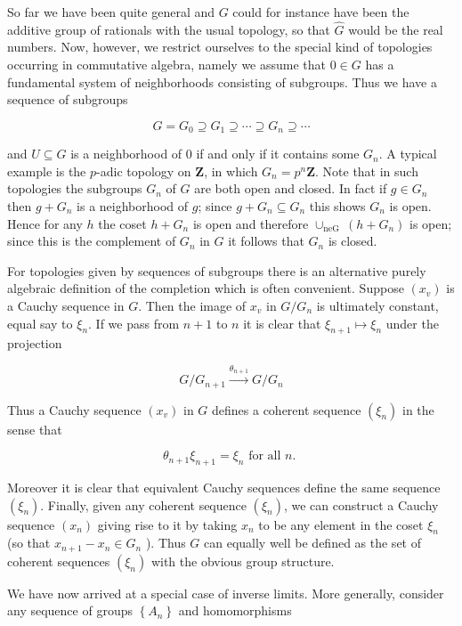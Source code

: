 \documentclass{standalone}
\theoremstyle{definition}
\theoremstyle{remark}
\begin{document}
So far we have been quite general and $G$ could for instance have been the additive group of rationals with the usual topology, so that $\hat{G}$ would be the real numbers. Now, however, we restrict ourselves to the special kind of topologies occurring in commutative algebra, namely we assume that $0 \in G$ has a fundamental system of neighborhoods consisting of subgroups. Thus we have a sequence of subgroups

\[
G=G_{0} \supseteq G_{1} \supseteq \cdots \supseteq G_{n} \supseteq \cdots
\]

and $U \subseteq G$ is a neighborhood of 0 if and only if it contains some $G_{n}$. A typical example is the $p$-adic topology on $\mathbf{Z}$, in which $G_{n}=p^{n} \mathbf{Z}$. Note that in such topologies the subgroups $G_{n}$ of $G$ are both open and closed. In fact if $g \in G_{n}$ then $g+G_{n}$ is a neighborhood of $g$; since $g+G_{n} \subseteq G_{n}$ this shows $G_{n}$ is open. Hence for any $h$ the coset $h+G_{n}$ is open and therefore $\cup_{\text {neG }}\left(h+G_{n}\right)$ is open; since this is the complement of $G_{n}$ in $G$ it follows that $G_{n}$ is closed.

For topologies given by sequences of subgroups there is an alternative purely algebraic definition of the completion which is often convenient. Suppose $\left(x_{v}\right)$ is a Cauchy sequence in $G$. Then the image of $x_{v}$ in $G / G_{n}$ is ultimately constant, equal say to $\xi_{n}$. If we pass from $n+1$ to $n$ it is clear that $\xi_{n+1} \mapsto \xi_{n}$ under the projection

\[
G / G_{n+1} \stackrel{\theta_{n+1}}{\longrightarrow} G / G_{n}
\]

Thus a Cauchy sequence $\left(x_{v}\right)$ in $G$ defines a coherent sequence $\left(\xi_{n}\right)$ in the sense that

\[
\theta_{n+1} \xi_{n+1}=\xi_{n} \text { for all } n \text {. }
\]

Moreover it is clear that equivalent Cauchy sequences define the same sequence $\left(\xi_{n}\right)$. Finally, given any coherent sequence $\left(\xi_{n}\right)$, we can construct a Cauchy sequence $\left(x_{n}\right)$ giving rise to it by taking $x_{n}$ to be any element in the coset $\xi_{n}$ (so that $x_{n+1}-x_{n} \in G_{n}$ ). Thus $G$ can equally well be defined as the set of coherent sequences $\left(\xi_{n}\right)$ with the obvious group structure.

We have now arrived at a special case of inverse limits. More generally, consider any sequence of groups $\left\{A_{n}\right\}$ and homomorphisms
\end{document}
